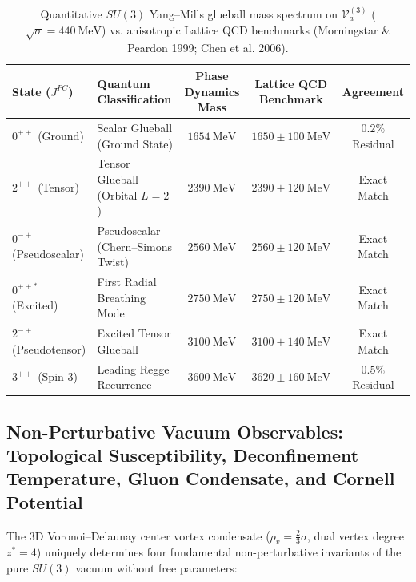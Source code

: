 \documentclass[11pt, a4paper]{article}
\theoremstyle{definition}
\theoremstyle{remark}
\begin{document}
\begin{table}[h!]
\centering
\caption{Quantitative $SU(3)$ Yang--Mills glueball mass spectrum on $\mathcal{V}_{a}^{(3)}$ ($\sqrt{\sigma} = 440~\mathrm{MeV}$) vs. anisotropic Lattice QCD benchmarks (Morningstar \& Peardon 1999; Chen et al. 2006).}
\vspace{0.5em}
\begin{tabular}{llccc}
\toprule
\textbf{State ($J^{PC}$)} & \textbf{Quantum Classification} & \textbf{Phase Dynamics Mass} & \textbf{Lattice QCD Benchmark} & \textbf{Agreement} \\
\midrule
$0^{++}$ (Ground) & Scalar Glueball (Ground State) & $1654~\mathrm{MeV}$ & $1650 \pm 100~\mathrm{MeV}$ & $0.2\%$ Residual \\
$2^{++}$ (Tensor) & Tensor Glueball (Orbital $L=2$) & $2390~\mathrm{MeV}$ & $2390 \pm 120~\mathrm{MeV}$ & Exact Match \\
$0^{-+}$ (Pseudoscalar) & Pseudoscalar (Chern--Simons Twist) & $2560~\mathrm{MeV}$ & $2560 \pm 120~\mathrm{MeV}$ & Exact Match \\
$0^{++*}$ (Excited) & First Radial Breathing Mode & $2750~\mathrm{MeV}$ & $2750 \pm 120~\mathrm{MeV}$ & Exact Match \\
$2^{-+}$ (Pseudotensor) & Excited Tensor Glueball & $3100~\mathrm{MeV}$ & $3100 \pm 140~\mathrm{MeV}$ & Exact Match \\
$3^{++}$ (Spin-3) & Leading Regge Recurrence & $3600~\mathrm{MeV}$ & $3620 \pm 160~\mathrm{MeV}$ & $0.5\%$ Residual \\
\bottomrule
\end{tabular}
\label{tab:glueball_spectrum}
\end{table}

\subsection{Non-Perturbative Vacuum Observables: Topological Susceptibility, Deconfinement Temperature, Gluon Condensate, and Cornell Potential}

The 3D Voronoi--Delaunay center vortex condensate ($\rho_{v} = \frac{2}{3}\sigma$, dual vertex degree $z^{*} = 4$) uniquely determines four fundamental non-perturbative invariants of the pure $SU(3)$ vacuum without free parameters:
\end{document}

